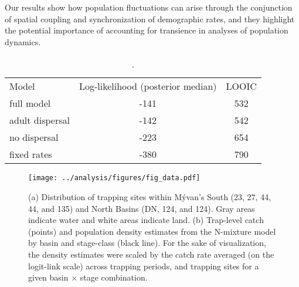 \documentclass[11pt]{article}
\begin{document}
Our results show how population fluctuations can arise through the conjunction of 
spatial coupling and synchronization of demographic rates, 
and they highlight the potential importance 
of accounting for transience in analyses of population dynamics.






\clearpage



\clearpage
\begin{table}
\caption{\label{tab:compare}
.
}
\setlength{\tabcolsep}{12pt}
\begin{tabular}{lcc}
\toprule
Model                  &    Log-likelihood (posterior median) & LOOIC \\
\cmidrule{1-3}
full model             & -141 & 532 \\
adult dispersal        & -142 & 542 \\
no dispersal           & -223 & 654 \\
fixed rates            & -380 & 790 \\
\bottomrule
\end{tabular}
\end{table}
\clearpage

\clearpage
\begin{figure}
\centering
\texttt{[image: ../analysis/figures/fig\_data.pdf]}
\caption{\label{fig:data}
(a) Distribution of trapping sites within M\'{y}van's
South (23, 27, 44, 44, and 135) and North Basins (DN, 124, and 124). 
Gray areas indicate water and white areas indicate land.
(b) Trap-level catch (points) and 
population density estimates from the N-mixture model by basin and stage-class (black line).
For the sake of visualization, the density estimates were scaled 
by the catch rate averaged (on the logit-link scale) across trapping periods,
and trapping sites for a given basin $\times$ stage combination.
}
\end{figure}
\clearpage
\end{document}
